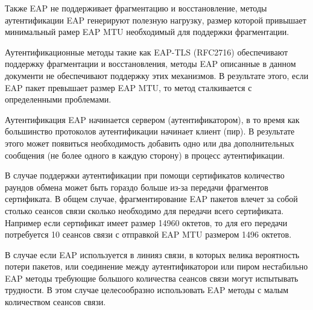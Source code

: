 Также EAP не поддерживает фрагментацию и восстановление, методы аутентификации EAP генерируют полезную нагрузку, размер которой привышает минимальный рамер EAP MTU необходимый для поддержки фрагментации.

Аутентификационные методы такие как EAP-TLS (RFC2716) обеспечивают поддержку фрагментации и восстановления, методы EAP описанные в данном документи не обеспечивают поддержку этих механизмов. В результате этого, если EAP пакет превышает размер EAP MTU, то метод сталкивается с определенными проблемами.

Аутентификация EAP начинается сервером (аутентификатором), в то время как большинство протоколов аутентификации начинает клиент (пир). В результате этого может появиться необходимость добавить одно или два дополнительных сообщения (не более одного в каждую сторону) в процесс аутентификации.

В случае поддержки аутентификации при помощи сертификатов количество раундов обмена может быть гораздо больше из-за передачи фрагментов сертификата. В общем случае, фрагментирование EAP пакетов влечет за собой столько сеансов связи сколько необходимо для передачи всего сертификата. Например если сертификат имеет размер 14960 октетов, то для его передачи потребуется 10 сеансов связи с отправкой EAP MTU размером 1496 октетов.

В случае если EAP используется в линияз связи, в которых велика вероятность потери пакетов, или соединение между аутентификаторои или пиром нестабильно EAP методы требующие большого количества сеансов связи могут испытывать трудности. В этом случае целесообразно использовать EAP методы с малым количеством сеансов связи.
